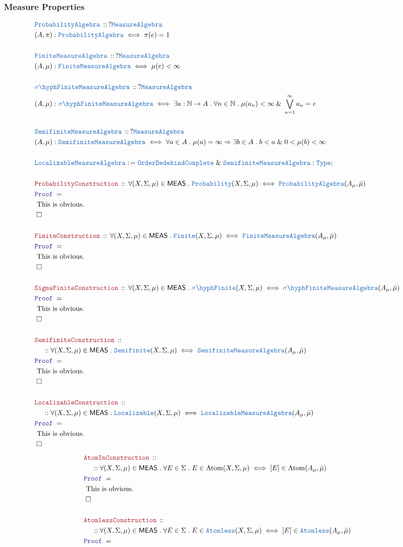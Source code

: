 \documentclass[12pt]{scrartcl}
\newcommand{\TYPE}[1]{\textcolor{NavyBlue}{\mathtt{#1}}}
\newcommand{\LOGIC}[1]{\textcolor{Blue}{\mathtt{#1}}}
\newcommand{\THM}[1]{\textcolor{Maroon}{\mathtt{#1}}}
\renewcommand{\.}{\; . \;}
\newcommand{\de}{: \kern 0.1pc =}
\newcommand{\Theorem}[2]{& \THM{#1} \, :: \, #2 \\ & \Proof = \\ }
\newcommand{\DeclareType}[2]{& \TYPE{#1} \, :: \, #2 \\}
\newcommand{\DefineType}[3]{& #1 : \TYPE{#2} \iff #3 \\}
\newcommand{\NewLine}{\\ & \kern 1pc}
\newcommand{\Page}[1]{ \begin{align*} #1 \end{align*}   }
\renewcommand{\And}{\; \& \;}
\newcommand{\Imply}{\Rightarrow}
\newcommand{\Type}{\TYPE{Type}}
\newcommand{\Nat}{\mathbb{N} }
\newcommand{\Conclude}[3]{& #1 \de #2 : #3; \\}
\newcommand{\QED}{\; \square}
\newcommand{\EndProof}{& \QED \\}
\newcommand{\Proof}{\LOGIC{Proof} \; }
\newcommand{\Explain}[1]{& \text{#1.} \\}
\newcommand{\Finite}{\TYPE{Finite}}
\newcommand{\OComplete}{\TYPE{OrderDedekindComplete}}
\newcommand{\Aless}{\TYPE{Atomless}}
\DeclareMathOperator{\Atom}{Atom}
\newcommand{\sFinite}{\TYPE{\sigma \hyph  Finite}}
\newcommand{\Semifinite}{\TYPE{Semifinite}}
\newcommand{\Loc}{\TYPE{Localizable}}
\newcommand{\MEAS}{\mathsf{MEAS}}
\newcommand{\MA}{\TYPE{MeasureAlgebra}}
\begin{document}
\subsubsection{Measure Properties}
\Page{
	\DeclareType{ProbabilityAlgebra}{?\MA}
	\DefineType{(A,\pi)}{ProbabilityAlgebra}{\pi(e) = 1}
	\\
	\DeclareType{Finite\MA}{?\MA}
	\DefineType{(A,\mu)}{Finite\MA}{\mu(e) < \infty}
	\\
	\DeclareType{\sFinite\MA}{?\MA}
	\DefineType{(A,\mu)}{\sFinite\MA}
	{
		\exists a : \Nat \to A \. \forall n \in \Nat \. \mu(a_n) < \infty \And \bigvee^\infty_{n=1} a_n = e
	}
	\\
	\DeclareType{\Semifinite\MA}{?\MA}
	\DefineType{(A,\mu)}{\Semifinite\MA}
	{
		\forall a \in A \. \mu(a) = \infty \Imply \exists b \in A \. b  < a \And 0 < \mu(b) < \infty
	}
	\\
	\Conclude{\Loc\MA}{ \OComplete \And \Semifinite\MA }{\Type}
	\\
	\Theorem{ProbabilityConstruction}
	{
		\forall (X,\Sigma,\mu) \in \MEAS \.
		\TYPE{Probability}(X,\Sigma,\mu)
		\iff 	
		\TYPE{ProbabilityAlgebra}(A_\mu,\bar \mu)
	}
	\Explain{ This is obvious}
	\EndProof
	\\
	\Theorem{FiniteConstruction}
	{
		\forall (X,\Sigma,\mu) \in \MEAS \.
		\Finite(X,\Sigma,\mu)
		\iff 	
		\Finite\MA(A_\mu,\bar \mu)
	}
	\Explain{ This is obvious}
	\EndProof
	\\
	\Theorem{SigmaFiniteConstruction}
	{
		\forall (X,\Sigma,\mu) \in \MEAS \.
		\sFinite(X,\Sigma,\mu)
		\iff 	
		\sFinite\MA(A_\mu,\bar \mu)
	}
	\Explain{ This is obvious}
	\EndProof
	\\
	\Theorem{SemifiniteConstruction}
	{
		\NewLine ::
		\forall (X,\Sigma,\mu) \in \MEAS \.
		\Semifinite(X,\Sigma,\mu)
		\iff 	
		\Semifinite\MA(A_\mu,\bar \mu)
	}
	\Explain{ This is obvious}
	\EndProof
	\\
	\Theorem{LocalizableConstruction}
	{
		\NewLine ::		
		\forall (X,\Sigma,\mu) \in \MEAS \.
		\Loc(X,\Sigma,\mu)
		\iff 	
		\Loc\MA(A_\mu,\bar \mu)
	}
	\Explain{ This is obvious}
	\EndProof
}\Page{
	\Theorem{AtomInConstruction}
	{
		\NewLine ::		
		\forall (X,\Sigma,\mu) \in \MEAS \.
		\forall  E \in \Sigma \.
		E \in \Atom(X,\Sigma,\mu)
		\iff
		[E] \in \Atom(A_\mu,\bar\mu)
	}
	\Explain{ This is obvious}
	\EndProof
	\\
	\Theorem{AtomlessConstruction}
	{
		\NewLine ::		
		\forall (X,\Sigma,\mu) \in \MEAS \.
		\forall  E \in \Sigma \.
		E \in \Aless(X,\Sigma,\mu)
		\iff
		[E] \in \Aless(A_\mu,\bar\mu)
	}
}
\end{document}
